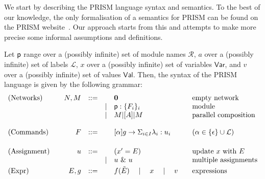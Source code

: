 We start by describing the PRISM language syntax and semantics. To the
best of our knowledge, the only formalisation of a semantics for PRISM
can be found on the PRISM website~\cite{prismemantics}. Our approach
starts from this and attempts to make more precise some informal
assumptions and definitions.

\smallskip

 Let $\textsf{p}$ range over a (possibly infinite) set of
module names $\mathcal R$, $a$ over a (possibly infinite) set of
labels $\mathcal L$, $x$ over a (possibly infinite) set of variables
$\mathsf{Var}$, and $v$ over a (possibly infinite) set of values
$\mathsf{Val}$. Then, the syntax of the PRISM language is given by the
following grammar:
\begin{displaymath}
  \begin{array}{lrlll@{\qquad}l}
    \text{(Networks)}  \quad
    & N, M  & ::=  &      & \CEnd & \text{empty network}\\
    &       &      & \mid & \role{p}:\{F_i\}_i & \text{module}\\
    &       &      & \mid & M \ppp A M & \text{parallel composition}\\
    \\
    \text{(Commands)}  \quad
    & F     & ::=  &      & \command \alpha g\lambda u
                                  & \text{} (\alpha\in\{\epsilon\}\cup\mathcal L) \\
    \\[1mm]
    \text{(Assignment)} \quad
    & u     & ::=  &      & (x' = E) & \text{update $x$ %
                                       with $E$}\\
    &       &      & \mid & u\ \&\ u   & \text{multiple assignments}
    \\[1mm]
    \text{(Expr)}\quad
    & E, g     & ::= &       & f(\tilde E)\quad\mid\quad x\quad\mid\quad v & \text{expressions}
  \end{array}
\end{displaymath}
